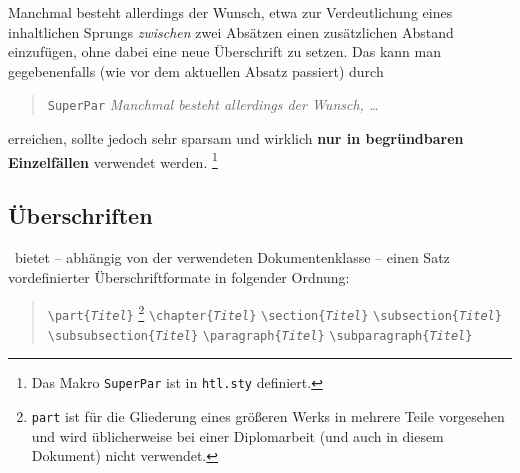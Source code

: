 \SuperPar 
Manchmal besteht allerdings der Wunsch, etwa zur Verdeutlichung eines inhaltlichen Sprungs \emph{zwischen} zwei Absätzen einen zusätzlichen Abstand einzufügen, ohne dabei eine neue Überschrift zu setzen. Das kann man gegebenenfalls (wie vor dem aktuellen Absatz passiert) durch 
%
\begin{quote}
\texttt{{\bs}SuperPar} \emph{Manchmal besteht allerdings der Wunsch, \ldots}
\end{quote}
%
erreichen, sollte jedoch sehr sparsam und wirklich \textbf{nur in begründbaren Einzelfällen} verwendet werden.%
\footnote{Das Makro \texttt{{\bs}SuperPar} ist in \texttt{htl.sty} definiert.}




\subsection{Überschriften}
\label{sec:ueberschriften}

\latex\ bietet -- abhängig von der verwendeten Dokumentenklasse --
einen Satz vordefinierter Überschriftformate in folgender Ordnung:
%
\begin{quote}
\verb!\part{!\texttt{\em Titel}\verb!}!%
\footnote{\texttt{part} ist für die Gliederung eines
größeren Werks in mehrere Teile vorgesehen und wird üblicherweise
bei einer Diplomarbeit (und auch in diesem Dokument) nicht
verwendet.}
\newline%
\verb!\chapter{!\texttt{\em Titel}\verb!}! \newline%
\verb!\section{!\texttt{\em Titel}\verb!}! \newline%
\verb!\subsection{!\texttt{\em Titel}\verb!}! \newline%
\verb!\subsubsection{!\texttt{\em Titel}\verb!}! \newline%
\verb!\paragraph{!\texttt{\em Titel}\verb!}! \newline%
\verb!\subparagraph{!\texttt{\em Titel}\verb!}!
\end{quote}
%

